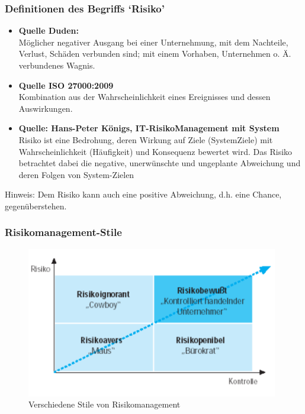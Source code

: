 \documentclass[10pt,a4paper]{article}
\begin{document}
\subsubsection*{Definitionen des Begriffs `Risiko'}
\begin{itemize}[noitemsep,topsep=0pt,leftmargin=*]
    \item \textbf{Quelle Duden:} \\ Möglicher negativer Ausgang bei einer Unternehmung, mit
    dem Nachteile, Verlust, Schäden verbunden sind; mit einem
    Vorhaben, Unternehmen o. Ä. verbundenes Wagnis.
    \item \textbf{Quelle ISO 27000:2009} \\ Kombination aus der Wahrscheinlichkeit eines Ereignisses und
    dessen Auswirkungen.
    \item \textbf{Quelle: Hans-Peter Königs, IT-RisikoManagement mit System} \\Risiko ist eine Bedrohung, deren Wirkung auf Ziele (SystemZiele) mit Wahrscheinlichkeit (Häufigkeit) und Konsequenz
    bewertet wird. Das Risiko betrachtet dabei die negative,
    unerwünschte und ungeplante Abweichung und deren Folgen
    von System-Zielen
\end{itemize}
Hinweis: Dem Risiko kann auch eine positive Abweichung, d.h. eine Chance, gegenüberstehen.

\subsubsection*{Risikomanagement-Stile}
\begin{figure}[H]
    \begin{center}
    \includegraphics[width=11cm]{images/KPMG_Risikomanagementstile.png}
    \caption{Verschiedene Stile von Risikomanagement}
    \label{risikomanagementstile}
    \end{center}
\end{figure}
\end{document}
